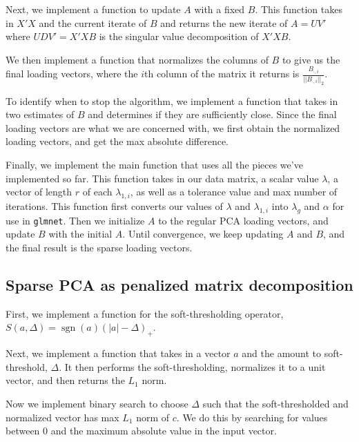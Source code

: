 \documentclass[11pt]{article}
\newcommand{\sgn}{\operatorname*{sgn}}
\begin{document}
Next, we implement a function to update $A$ with a fixed $B$. This function takes in $X'X$ and the current iterate of $B$ and returns the new iterate of $A = UV'$ where $UDV' = X'XB$ is the singular value decomposition of $X'XB$. 


We then implement a function that normalizes the columns of $B$ to give us the final loading vectors, where the $i$th column of the matrix it returns is $\frac{B_{\cdot, i}}{||B_{\cdot, i}||_2}$. 
  


To identify when to stop the algorithm, we implement a function that takes in two estimates of $B$ and determines if they are sufficiently close. Since the final loading vectors are what we are concerned with, we first obtain the normalized loading vectors, and get the max absolute difference. 


Finally, we implement the main function that uses all the pieces we've implemented so far. This function takes in our data matrix, a scalar value $\lambda$, a vector of length $r$ of each $\lambda_{1, i}$, as well as a tolerance value and max number of iterations. This function first converts our values of $\lambda$ and $\lambda_{1, i}$ into $\lambda_g$ and $\alpha$ for use in \texttt{glmnet}. Then we initialize $A$ to the regular PCA loading vectors, and update $B$ with the initial $A$. Until convergence, we keep updating $A$ and $B$, and the final result is the sparse loading vectors. 


\subsection{Sparse PCA as penalized matrix decomposition}

First, we implement a function for the soft-thresholding operator, $S(a, \Delta) = \sgn(a)(|a| - \Delta)_{+}$. 


Next, we implement a function that takes in a vector $a$ and the amount to soft-threshold, $\Delta$. It then performs the soft-thresholding, normalizes it to a unit vector, and then returns the $L_1$ norm.


Now we implement binary search to choose $\Delta$ such that the soft-thresholded and normalized vector has max $L_1$ norm of $c$. We do this by searching for values between $0$ and the maximum absolute value in the input vector. 

\end{document}
